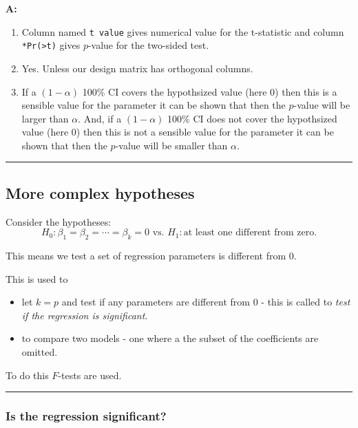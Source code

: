 \documentclass[]{article}
\providecommand{\tightlist}{%
  \setlength{\itemsep}{0pt}\setlength{\parskip}{0pt}}
\begin{document}
\textbf{A:}

\begin{enumerate}
\def\labelenumi{\arabic{enumi}.}
\tightlist
\item
  Column named \texttt{t\ value} gives numerical value for the
  t-statistic and column
  \texttt{*Pr(\textgreater{}\textbar{}t\textbar{})} gives \(p\)-value
  for the two-sided test.
\item
  Yes. Unless our design matrix has orthogonal columns.
\item
  If a \((1-\alpha)\) 100\% CI covers the hypothsized value (here 0)
  then this is a sensible value for the parameter it can be shown that
  then the \(p\)-value will be larger than \(\alpha\). And, if a
  \((1-\alpha)\) 100\% CI does not cover the hypothsized value (here 0)
  then this is not a sensible value for the parameter it can be shown
  that then the \(p\)-value will be smaller than \(\alpha\).
\end{enumerate}

\begin{center}\rule{0.5\linewidth}{\linethickness}\end{center}

\hypertarget{more-complex-hypotheses}{%
\subsection{More complex hypotheses}\label{more-complex-hypotheses}}

Consider the hypotheses:
\[ H_0: \beta_1=\beta_2=\cdots= \beta_k =0 \text{ vs. } H_1: \text{at least one different from zero}.\]

This means we test a set of regression parameters is different from 0.

This is used to

\begin{itemize}
\tightlist
\item
  let \(k=p\) and test if any parameters are different from 0 - this is
  called to \emph{test if the regression is significant}.
\item
  to compare two models - one where a the subset of the coefficients are
  omitted.
\end{itemize}

To do this \(F\)-tests are used.

\begin{center}\rule{0.5\linewidth}{\linethickness}\end{center}

\hypertarget{is-the-regression-significant}{%
\subsubsection{Is the regression
significant?}\label{is-the-regression-significant}}
\end{document}
